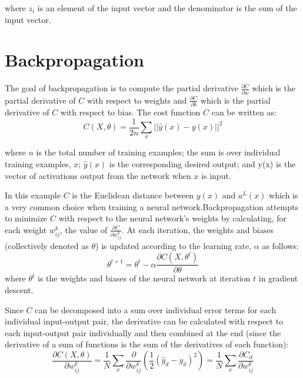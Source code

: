 where $z_i$ is an element of the input vector and the denominator is the sum of the input vector.

\section{Backpropagation}

The goal of backpropagation is to compute the partial derivative $\frac{\partial C}{\partial w}$ which is the partial derivative of $C$ with respect to weights and $\frac{\partial C}{\partial b}$ which is the partial derivative of $C$ with respect to bias. The cost function $C$ can be written as:
\begin{equation}
    C(X,\theta) = \frac{1}{2n} \sum_x ||\hat{y}(x) - y(x)||^2 
\end{equation}

where $n$ is the total number of training examples; the sum is over individual training examples, $x$; $\hat{y}(x)$ is the corresponding desired output; and y(x) is the vector of activations output from the network when $x$ is input.

In this example $C$ is the Euclidean distance between $y(x)$ and $a^L(x)$ which is a very common choice when training a neural network.Backpropagation attempts to minimize $C$ with respect to the neural network's weights by calculating, for each weight $w_{ij}^k$, the value of $\frac{\partial C}{\partial w_{ij}^k}$. At each iteration, the weights and biases (collectively denoted as $\theta$) is updated according to the learning rate, $\alpha$ as follows:
\begin{equation}
    \theta^{t+1} = \theta^t - \alpha \frac{\partial C(X,\theta^t)}{\partial \theta}
\end{equation}
where $\theta^t$ is the weights and biases of the neural network at iteration $t$ in gradient descent.

Since $C$ can be decomposed into a sum over individual error terms for each individual input-output pair, the derivative can be calculated with respect to each input-output pair individually and then combined at the end (since the derivative of a sum of functions is the sum of the derivatives of each function):
\begin{equation}
    \frac{\partial C(X,\theta)}{\partial w_{ij}^k} = \frac{1}{N} \sum_x \frac{\partial}{\partial w_{ij}^k}(\frac{1}{2}(\hat{y}_d-y_d)^2) = \frac{1}{N} \sum_x \frac{\partial C_d}{\partial w_{ij}^k}
\end{equation}

